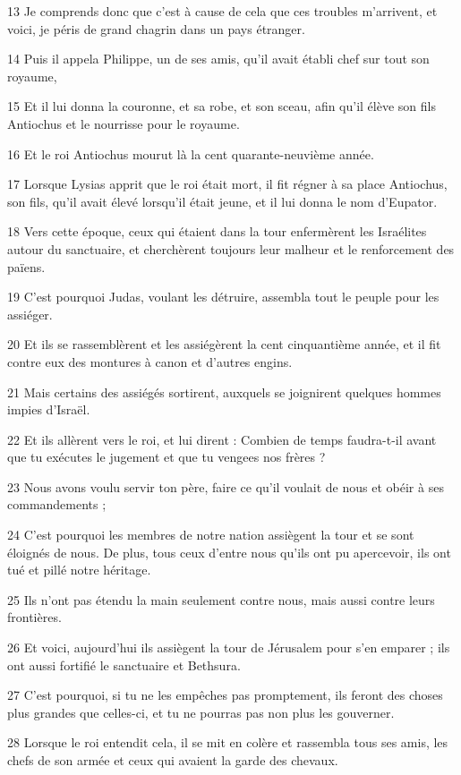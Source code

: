 \par 13 Je comprends donc que c'est à cause de cela que ces troubles m'arrivent, et voici, je péris de grand chagrin dans un pays étranger.
\par 14 Puis il appela Philippe, un de ses amis, qu'il avait établi chef sur tout son royaume,
\par 15 Et il lui donna la couronne, et sa robe, et son sceau, afin qu'il élève son fils Antiochus et le nourrisse pour le royaume.
\par 16 Et le roi Antiochus mourut là la cent quarante-neuvième année.
\par 17 Lorsque Lysias apprit que le roi était mort, il fit régner à sa place Antiochus, son fils, qu'il avait élevé lorsqu'il était jeune, et il lui donna le nom d'Eupator.
\par 18 Vers cette époque, ceux qui étaient dans la tour enfermèrent les Israélites autour du sanctuaire, et cherchèrent toujours leur malheur et le renforcement des païens.
\par 19 C'est pourquoi Judas, voulant les détruire, assembla tout le peuple pour les assiéger.
\par 20 Et ils se rassemblèrent et les assiégèrent la cent cinquantième année, et il fit contre eux des montures à canon et d'autres engins.
\par 21 Mais certains des assiégés sortirent, auxquels se joignirent quelques hommes impies d'Israël.
\par 22 Et ils allèrent vers le roi, et lui dirent : Combien de temps faudra-t-il avant que tu exécutes le jugement et que tu vengees nos frères ?
\par 23 Nous avons voulu servir ton père, faire ce qu'il voulait de nous et obéir à ses commandements ;
\par 24 C'est pourquoi les membres de notre nation assiègent la tour et se sont éloignés de nous. De plus, tous ceux d'entre nous qu'ils ont pu apercevoir, ils ont tué et pillé notre héritage.
\par 25 Ils n'ont pas étendu la main seulement contre nous, mais aussi contre leurs frontières.
\par 26 Et voici, aujourd'hui ils assiègent la tour de Jérusalem pour s'en emparer ; ils ont aussi fortifié le sanctuaire et Bethsura.
\par 27 C'est pourquoi, si tu ne les empêches pas promptement, ils feront des choses plus grandes que celles-ci, et tu ne pourras pas non plus les gouverner.
\par 28 Lorsque le roi entendit cela, il se mit en colère et rassembla tous ses amis, les chefs de son armée et ceux qui avaient la garde des chevaux.
